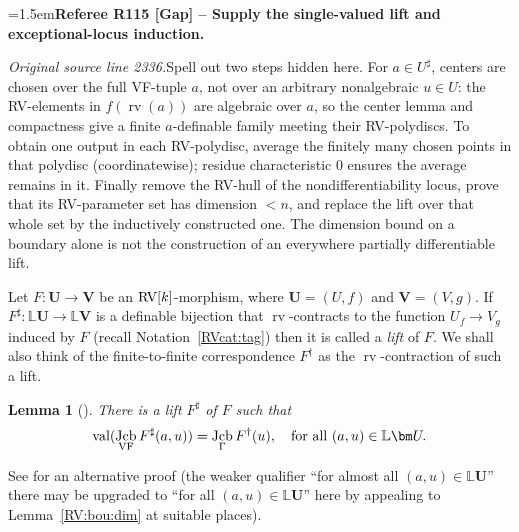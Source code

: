 \documentclass[12pt]{amsart}
\newcommand{\RefereeRemark}[4]{%
  \par\medskip\begingroup\normalfont\small\color{RefereePurple}%
  \emergencystretch=1.5em\noindent\textbf{Referee R#1 [#2] -- #3.}\par\nobreak\noindent #4\par
  \endgroup\medskip
}
\newcommand{\arthur}[1]{{\color{red}#1}}
\newcommand{\memph}[1]{{\color{magenta}\emph{#1}}}
\theoremstyle{plain}
\newtheorem{lem}[thm]{Lemma}
\theoremstyle{definition}
\theoremstyle{remark}
\numberwithin{equation}{section}
\theoremstyle{plain}
\newcommand{\VF}{\textup{VF}}
\newcommand{\RV}{\textup{RV}}
\DeclareMathOperator{\jcb}{Jcb}
\newcommand{\0}{\emptyset}
\newcommand{\bb}[1]{\mathbb{#1}}
\newcommand{\fun}{\longrightarrow}
\DeclareMathOperator{\rv}{rv}
\DeclareMathOperator{\vv}{val}
\begin{document}
\RefereeRemark{115}{Gap}{Supply the single-valued lift and exceptional-locus induction}{%
\textit{Original source line 2336.}\quad Spell out two steps hidden here. For $a\in U^\sharp$, centers are chosen over the full VF-tuple $a$, not over an arbitrary nonalgebraic $u\in U$: the RV-elements in $f(\rv(a))$ are algebraic over $a$, so the center lemma and compactness give a finite $a$-definable family meeting their RV-polydiscs. To obtain one output in each RV-polydisc, average the finitely many chosen points in that polydisc (coordinatewise); residue characteristic $0$ ensures the average remains in it. Finally remove the RV-hull of the nondifferentiability locus, prove that its RV-parameter set has dimension $<n$, and replace the lift over that whole set by the inductively constructed one. The dimension bound on a boundary alone is not the construction of an everywhere partially differentiable lift.
}

Let $F: \bm U \fun \bm V$ be an $\RV[k]$-morphism, where $\bm U = (U, f)$ and $\bm V = (V, g)$. If $F^{\sharp} : \bb L \bm U \fun \bb L \bm V$ is a definable bijection that $\rv$-contracts to the function $U_f \fun V_g$ induced by $F$ (recall Notation~\ref{RVcat:tag}) then it is called a \memph{lift} of $F$. We shall also think of the finite-to-finite correspondence $F^\dag$ as the $\rv$-contraction of such a lift.



\begin{lem}[{\cite[Lemma~6.3]{hrushovski:kazhdan:integration:vf}}]\label{iso:lifted:vol}
There is a lift $F^{\sharp}$ of $F$ such that
\begin{equation}\label{jac:mat}
\vv(\jcb_{\VF} F^{\sharp}(a,  u)) = \jcb_{\Gamma} F^\dag(u), \quad \text{for all } (a, u) \in \bb L \bm U.
\end{equation}
\end{lem}

See \cite[Corollary~7.7]{Yin:special:trans} for an alternative proof (the weaker qualifier ``for almost all $(a, u) \in \bb L \bm U$'' there may be upgraded to ``for all $(a, u) \in \bb L \bm U$'' here by appealing to Lemma~\ref{RV:bou:dim} at suitable places).
\end{document}
